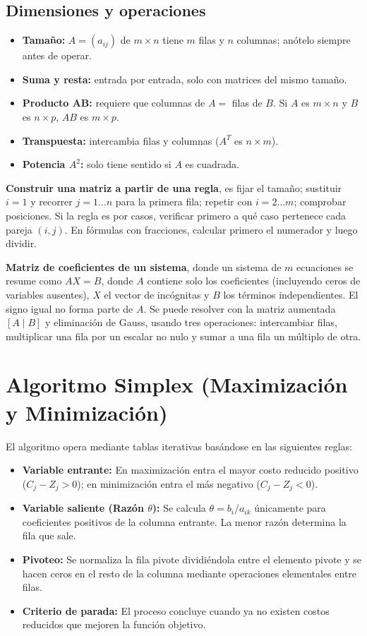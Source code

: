 \documentclass{article}
\begin{document}
\subsection{Dimensiones y operaciones}
\begin{itemize}
    \item \textbf{Tamaño:} $A = (a_{ij})$ de $m \times n$ tiene $m$ filas y $n$ columnas; anótelo siempre antes de operar.
    \item \textbf{Suma y resta:} entrada por entrada, solo con matrices del mismo tamaño.
    \item \textbf{Producto AB:} requiere que columnas de $A =$ filas de $B$. Si $A$ es $m \times n$ y $B$ es $n \times p$, $AB$ es $m \times p$.
    \item \textbf{Transpuesta:} intercambia filas y columnas ($A^T$ es $n \times m$).
    \item \textbf{Potencia $A^2$:} solo tiene sentido si $A$ es cuadrada.
\end{itemize}

\textbf{Construir una matriz a partir de una regla}, es fijar el tamaño; sustituir $i = 1$ y recorrer $j = 1\dots n$ para la primera fila; repetir con $i = 2\dots m$; comprobar posiciones. Si la regla es por casos, verificar primero a qué caso pertenece cada pareja $(i, j)$. En fórmulas con fracciones, calcular primero el numerador y luego dividir.

\textbf{Matriz de coeficientes de un sistema}, donde un sistema de $m$ ecuaciones se resume como $AX = B$, donde $A$ contiene solo los coeficientes (incluyendo ceros de variables ausentes), $X$ el vector de incógnitas y $B$ los términos independientes. El signo igual no forma parte de $A$. Se puede resolver con la matriz aumentada $[A \mid B]$ y eliminación de Gauss, usando tres operaciones: intercambiar filas, multiplicar una fila por un escalar no nulo y sumar a una fila un múltiplo de otra.

\section{Algoritmo Simplex (Maximización y Minimización)}
El algoritmo opera mediante tablas iterativas basándose en las siguientes reglas:
\begin{itemize}
    \item \textbf{Variable entrante:} En maximización entra el mayor costo reducido positivo ($C_j - Z_j > 0$); en minimización entra el más negativo ($C_j - Z_j < 0$).
    \item \textbf{Variable saliente (Razón $\theta$):} Se calcula $\theta = b_i / a_{ik}$ únicamente para coeficientes positivos de la columna entrante. La menor razón determina la fila que sale.
    \item \textbf{Pivoteo:} Se normaliza la fila pivote dividiéndola entre el elemento pivote y se hacen ceros en el resto de la columna mediante operaciones elementales entre filas.
    \item \textbf{Criterio de parada:} El proceso concluye cuando ya no existen costos reducidos que mejoren la función objetivo.
\end{itemize}
\end{document}
